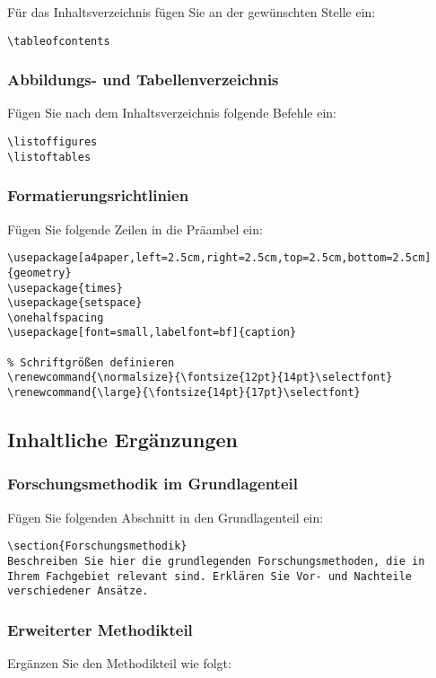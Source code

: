 \documentclass[a4paper,12pt]{article}
\renewcommand{\normalsize}{\fontsize{12pt}{14pt}\selectfont}
\renewcommand{\large}{\fontsize{14pt}{17pt}\selectfont}
\begin{document}
Für das Inhaltsverzeichnis fügen Sie an der gewünschten Stelle ein:
\begin{lstlisting}
\tableofcontents
\end{lstlisting}

\subsubsection{Abbildungs- und Tabellenverzeichnis}
Fügen Sie nach dem Inhaltsverzeichnis folgende Befehle ein:
\begin{lstlisting}
\listoffigures
\listoftables
\end{lstlisting}

\subsubsection{Formatierungsrichtlinien}
Fügen Sie folgende Zeilen in die Präambel ein:

\begin{lstlisting}
\usepackage[a4paper,left=2.5cm,right=2.5cm,top=2.5cm,bottom=2.5cm]{geometry}
\usepackage{times}
\usepackage{setspace}
\onehalfspacing
\usepackage[font=small,labelfont=bf]{caption}

% Schriftgrößen definieren
\renewcommand{\normalsize}{\fontsize{12pt}{14pt}\selectfont}
\renewcommand{\large}{\fontsize{14pt}{17pt}\selectfont}
\end{lstlisting}

\subsection{Inhaltliche Ergänzungen}

\subsubsection{Forschungsmethodik im Grundlagenteil}
Fügen Sie folgenden Abschnitt in den Grundlagenteil ein:

\begin{lstlisting}
\section{Forschungsmethodik}
Beschreiben Sie hier die grundlegenden Forschungsmethoden, die in Ihrem Fachgebiet relevant sind. Erklären Sie Vor- und Nachteile verschiedener Ansätze.
\end{lstlisting}

\subsubsection{Erweiterter Methodikteil}
Ergänzen Sie den Methodikteil wie folgt:
\end{document}
